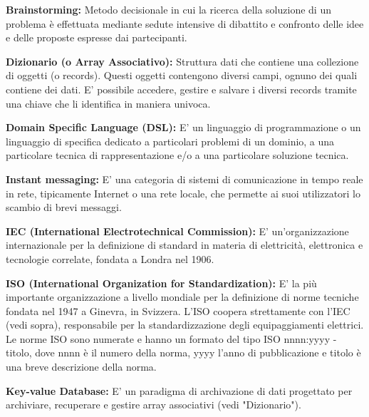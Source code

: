\documentclass{scalatekids-article}
\begin{document}
\textbf{Brainstorming:} Metodo decisionale in cui la ricerca della soluzione di un problema è effettuata mediante sedute intensive di dibattito e confronto delle idee e delle proposte espresse dai partecipanti.



\textbf{Dizionario (o Array Associativo):} Struttura dati che contiene una collezione di oggetti (o records).
Questi oggetti contengono diversi campi, ognuno dei quali contiene dei dati.
E' possibile accedere, gestire e salvare i diversi records tramite una chiave che li identifica in maniera univoca.

\textbf{Domain Specific Language (DSL):} E' un linguaggio di programmazione o un linguaggio di specifica dedicato a particolari problemi di un dominio, a una particolare tecnica di rappresentazione e/o a una particolare soluzione tecnica.






\textbf{Instant messaging: } E' una categoria di sistemi di comunicazione in tempo reale in rete, tipicamente Internet o una rete locale, che permette ai suoi utilizzatori lo scambio di brevi messaggi.

\textbf{IEC (International Electrotechnical Commission):} E' un'organizzazione internazionale per la definizione di standard in materia di elettricità, elettronica e tecnologie correlate, fondata a Londra nel 1906.

\textbf{ISO (International Organization for Standardization):} E' la più importante organizzazione a livello mondiale per la definizione di norme tecniche fondata nel 1947 a Ginevra, in Svizzera.
L'ISO coopera strettamente con l'IEC (vedi sopra), responsabile per la standardizzazione degli equipaggiamenti elettrici.
Le norme ISO sono numerate e hanno un formato del tipo ISO nnnn:yyyy - titolo, dove nnnn è il numero della norma, yyyy l'anno di pubblicazione e titolo è una breve descrizione della norma.



\textbf{Key-value Database:} E' un paradigma di archivazione di dati progettato per archiviare, recuperare e gestire array associativi (vedi "Dizionario").
\end{document}
